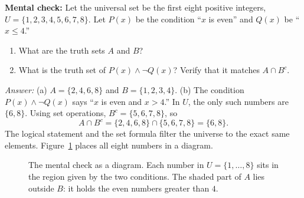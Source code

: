 \begin{recoverybox}
\textbf{Mental check:} Let the universal set be the first eight positive integers, $U = \{1, 2, 3, 4, 5, 6, 7, 8\}$. Let $P(x)$ be the condition ``$x$ is even'' and $Q(x)$ be ``$x \le 4$.''
\begin{enumerate}[label=(\alph*)]
  \item What are the truth sets $A$ and $B$?
  \item What is the truth set of $P(x) \land \neg Q(x)$? Verify that it matches $A \cap B^c$.
\end{enumerate}
\emph{Answer:} (a) $A = \{2, 4, 6, 8\}$ and $B = \{1, 2, 3, 4\}$. (b) The condition $P(x) \land \neg Q(x)$ says ``$x$ is even and $x > 4$.'' In $U$, the only such numbers are $\{6, 8\}$. Using set operations, $B^c = \{5, 6, 7, 8\}$, so
\[
A \cap B^c = \{2, 4, 6, 8\} \cap \{5, 6, 7, 8\} = \{6, 8\}.
\]
The logical statement and the set formula filter the universe to the exact same elements. Figure~\ref{31:fig-truth-sets-example} places all eight numbers in a diagram.
\end{recoverybox}

\begin{figure}[htbp]
\centering
{}
\caption{The mental check as a diagram. Each number in $U = \{1, \dots, 8\}$ sits in the region given by the two conditions. The shaded part of $A$ lies outside $B$: it holds the even numbers greater than $4$.}
\label{31:fig-truth-sets-example}
\end{figure}

